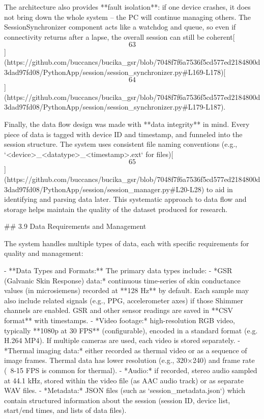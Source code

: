 \documentclass[12pt,a4paper]{article}
\begin{document}
The architecture also provides **fault isolation**: if one device
crashes, it does not bring down the whole system -- the PC will continue
managing others. The SessionSynchronizer component acts like a watchdog
and queue, so even if connectivity returns after a lapse, the overall
session can still be
coherent[\[63\]](https://github.com/buccancs/bucika_gsr/blob/7048f7f6a7536f5cd577ed2184800d3dad97fd08/PythonApp/session/session_synchronizer.py#L169-L178)[\[64\]](https://github.com/buccancs/bucika_gsr/blob/7048f7f6a7536f5cd577ed2184800d3dad97fd08/PythonApp/session/session_synchronizer.py#L179-L187).

Finally, the data flow design was made with **data integrity** in mind.
Every piece of data is tagged with device ID and timestamp, and funneled
into the session structure. The system uses consistent file naming
conventions (e.g., `<device>_<datatype>_<timestamp>.ext` for
files)[\[65\]](https://github.com/buccancs/bucika_gsr/blob/7048f7f6a7536f5cd577ed2184800d3dad97fd08/PythonApp/session/session_manager.py#L20-L28)
to aid in identifying and parsing data later. This systematic approach
to data flow and storage helps maintain the quality of the dataset
produced for research.

## 3.9 Data Requirements and Management

The system handles multiple types of data, each with specific
requirements for quality and management:

- **Data Types and Formats:** The primary data types include:
  - *GSR (Galvanic Skin Response) data:* continuous time-series of skin conductance values (in microsiemens) recorded at **128 Hz** by default. Each sample may also include related signals (e.g., PPG, accelerometer axes) if those Shimmer channels are enabled. GSR and other sensor readings are saved in **CSV format** with timestamps.
  - *Video footage:* high-resolution RGB video, typically **1080p at 30 FPS** (configurable), encoded in a standard format (e.g. H.264 MP4). If multiple cameras are used, each video is stored separately.
  - *Thermal imaging data:* either recorded as thermal video or as a sequence of image frames. Thermal data has lower resolution (e.g., 320×240) and frame rate (~8-15 FPS is common for thermal).
  - *Audio:* if recorded, stereo audio sampled at 44.1 kHz, stored within the video file (as AAC audio track) or as separate WAV files.
  - *Metadata:* JSON files (such as `session_metadata.json`) which contain structured information about the session (session ID, device list, start/end times, and lists of data files).
\end{document}
